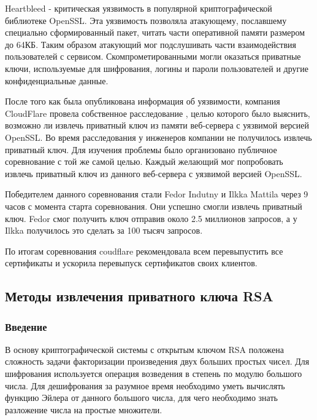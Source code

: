 \documentclass[20pt]{article}
\begin{document}
Heartbleed \cite{heartbleed} - критическая уязвимость в популярной криптографической
библиотеке OpenSSL. Эта уязвимость позволяла атакующему, пославшему специально
сформированный пакет, читать части оперативной памяти размером до 64КБ. Таким
образом атакующий мог подслушивать части взаимодействия пользователей с сервисом.
Скомпрометированными могли оказаться приватные ключи, используемые для шифрования,
логины и пароли пользователей и другие конфиденциальные данные.

После того как была опубликована информация об уязвимости, компания CloudFlare
провела собственное расследование \cite{heartbleed/investigation}, целью которого
было выяснить, возможно ли извлечь приватный ключ из памяти веб-сервера с
уязвимой версией OpenSSL. Во время расследования у инженеров компании не
получилось извлечь приватный ключ. Для изучения проблемы было организовано
публичное соревнование \cite{heartbleed/investigation} с той же самой целью.
Каждый желающий мог попробовать извлечь приватный ключ из данного веб-сервера с
уязвимой версией OpenSSL.

Победителем данного соревнования стали Fedor Indutny \cite{heartbleed/Indutny} и
Ilkka Mattila через 9 часов с момента старта соревнования. Они успешно смогли
извлечь приватный ключ. Fedor смог получить ключ отправив около 2.5 миллионов
запросов, а у Ilkka получилось это сделать за 100 тысяч запросов.

По итогам соревнования coudflare рекомендовала всем перевыпустить все сертификаты
и ускорила перевыпуск сертификатов своих клиентов.


\subsection{Методы извлечения приватного ключа RSA \cite{playing-hide-and-seek-with-stored-keys} }

\subsubsection{Введение}

В основу криптографической системы с открытым ключом RSA положена сложность задачи
факторизации произведения двух больших простых чисел. Для шифрования используется
операция возведения в степень по модулю большого числа. Для дешифрования за
разумное время необходимо уметь вычислять функцию Эйлера от данного большого
числа, для чего необходимо знать разложение числа на простые множители.
\end{document}
